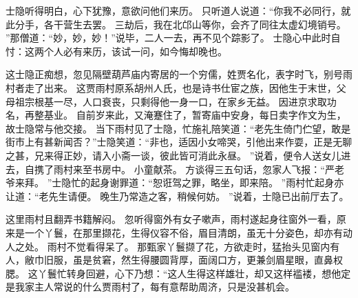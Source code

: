 士隐听得明白，心下犹豫，意欲问他们来历。
只听道人说道：“你我不必同行，就此分手，各干营生去罢。
三劫后，我在北邙山等你，会齐了同往太虚幻境销号。
”那僧道：“妙，妙，妙！”说毕，二人一去，再不见个踪影了。
士隐心中此时自忖：这两个人必有来历，该试一问，如今悔却晚也。
\par
 这士隐正痴想，忽见隔壁葫芦庙内寄居的一个穷儒，姓贾名化，表字时飞，别号雨村者走了出来。
这贾雨村原系胡州人氏，也是诗书仕宦之族，因他生于末世，父母祖宗根基一尽，人口衰丧，只剩得他一身一口，在家乡无益。
因进京求取功名，再整基业。
自前岁来此，又淹蹇住了，暂寄庙中安身，每日卖字作文为生，故士隐常与他交接。
当下雨村见了士隐，忙施礼陪笑道：“老先生倚门伫望，敢是街市上有甚新闻否？”士隐笑道：“非也，适因小女啼哭，引他出来作耍，正是无聊之甚，兄来得正妙，请入小斋一谈，彼此皆可消此永昼。
”说着，便令人送女儿进去，自携了雨村来至书房中。
小童献茶。
方谈得三五句话，忽家人飞报：“严老爷来拜。
”士隐忙的起身谢罪道：“恕诳驾之罪，略坐，即来陪。
”雨村忙起身亦让道：“老先生请便。
晚生乃常造之客，稍候何妨。
”说着，士隐已出前厅去了。
\par
 这里雨村且翻弄书籍解闷。
忽听得窗外有女子嗽声，雨村遂起身往窗外一看，原来是一个丫鬟，在那里撷花，生得仪容不俗，眉目清朗，虽无十分姿色，却亦有动人之处。
雨村不觉看得呆了。
那甄家丫鬟撷了花，方欲走时，猛抬头见窗内有人，敝巾旧服，虽是贫窘，然生得腰圆背厚，面阔口方，更兼剑眉星眼，直鼻权腮。
这丫鬟忙转身回避，心下乃想：“这人生得这样雄壮，却又这样褴褛，想他定是我家主人常说的什么贾雨村了，每有意帮助周济，只是没甚机会。
